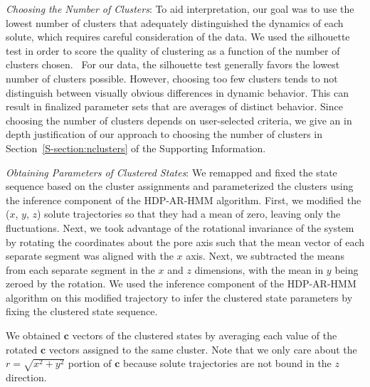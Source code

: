 \documentclass[journal=jpcbfk,manuscript=article]{achemso}
\begin{document}
  \textit{Choosing the Number of Clusters}: To aid interpretation, our goal was to
  use the lowest number of clusters that adequately distinguished the dynamics of 
  each solute, which requires careful consideration of the data. We used the silhouette
  test in order to score the quality of clustering as a function of the number of clusters
  chosen.~\cite{kaufman_finding_2009} For our data, the silhouette test generally favors 
  the lowest number of clusters possible. However, choosing too few clusters tends to not
  distinguish between visually obvious differences in dynamic behavior. This can result 
  in finalized parameter sets that are averages of distinct behavior. Since choosing 
  the number of clusters depends on user-selected criteria, we give an in depth 
  justification of our approach to choosing the number of clusters in 
  Section~\ref{S-section:nclusters} of the Supporting Information.  
  
  \textit{Obtaining Parameters of Clustered States}: We remapped and fixed the
  state sequence based on the cluster assignments and 
  parameterized the clusters using the inference component of the HDP-AR-HMM algorithm.
  First, we modified the ($x$, $y$, $z$) solute trajectories so that they had a 
  mean of zero, leaving only the fluctuations. Next, we took advantage of the
  rotational invariance of the system by rotating the coordinates about the pore 
  axis such that the mean vector of each separate segment was aligned with the 
  $x$ axis. Next, we subtracted the means from each separate segment in the $x$ 
  and $z$ dimensions, with the mean in $y$ being zeroed by the rotation. We used
  the inference component of the HDP-AR-HMM algorithm on this modified trajectory to 
  infer the clustered state parameters by fixing the clustered state sequence.
  
  We obtained $\mathbf{c}$ vectors of the clustered states by averaging each 
  value of the rotated $\mathbf{c}$ vectors assigned to the same cluster. Note
  that we only care about the $r=\sqrt{x^2+y^2}$ portion of $\mathbf{c}$ because
  solute trajectories are not bound in the $z$ direction.
  
\end{document}
